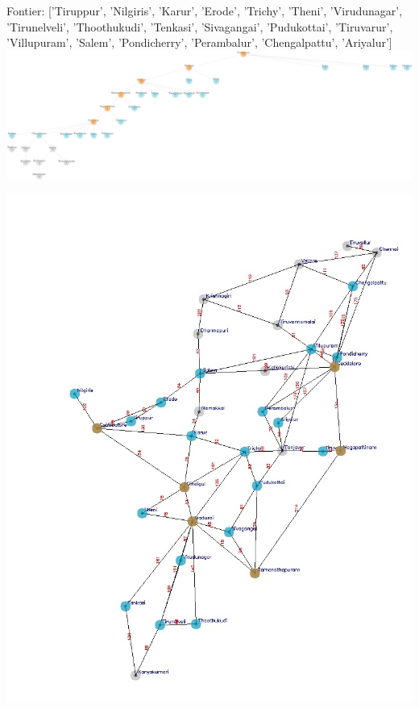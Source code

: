 \documentclass[xcolor=table]{beamer}
\begin{document}
\begin{frame}
  { \tiny Fontier: ['Tiruppur', 'Nilgiris', 'Karur', 'Erode', 'Trichy', 'Theni', 'Virudunagar', 'Tirunelveli', 'Thoothukudi', 'Tenkasi', 'Sivagangai', 'Pudukottai', 'Tiruvarur', 'Villupuram', 'Salem', 'Pondicherry', 'Perambalur', 'Chengalpattu', 'Ariyalur'] }
  \includegraphics[width=1\textwidth]{../DFSNodes/8-1.png}
  \begin{center}
    \includegraphics[height=0.45\textheight]{../DFSoutput/tamilDFS6.jpg}
  \end{center}
\end{frame}
\end{document}
